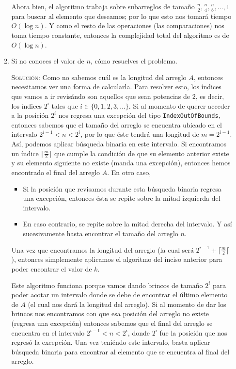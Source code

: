\documentclass[letterpaper,11pt]{article}
\begin{document}
\begin{enumerate}
\begin{enumerate}
        Ahora bien, el algoritmo trabaja sobre subarreglos de tamaño $\frac{n}{2}, 
        \frac{n}{4}, \frac{n}{8}, \ldots, 1$ para buscar al elemento que 
        deseamos; por lo que esto nos tomará tiempo $O(\log n)$. Y como el resto
        de las operaciones (las comparaciones) nos toma tiempo constante, 
        entonces la complejidad total del algoritmo es de $O(\log n)$. 
        
		\item Si no conoces el valor de $n$, cómo resuelves el problema.
        
        \textsc{Solución:} Como no sabemos cuál es la longitud del arreglo $A$, 
        entonces necesitamos ver una forma de calcularla. Para resolver esto, 
        los índices que vamos a ir revisándo son aquellos que sean potencias 
        de $2$, es decir, los índices $2^i$ tales que $i \in 
        \{0, 1, 2, 3, \ldots\}$. Si al momento de querer acceder a la posición 
        $2^i$ nos regresa una excepción del tipo \texttt{IndexOutOfBounds}, 
        entonces sabemos que el tamaño del arreglo se encuentra ubicado en el 
        intervalo $2^{i-1} < n < 2^{i}$, por lo que éste tendrá una longitud 
        de $m =2^{i-1}$. Así, podemos aplicar búsqueda binaria en este intervalo.
        Si encontramos un índice $\lceil \frac{m}{2} \rceil$ que cumple la 
        condición de que su elemento anterior existe y su elemento siguiente no 
        existe (manda una excepción), entonces hemos encontrado el final del 
        arreglo $A$. En otro caso, 
        \begin{itemize}
            \item Si la posición que revisamos durante esta búsqueda binaria 
            regresa una excepción, entonces ésta se repite sobre la mitad 
            izquierda del intervalo.

            \item En caso contrario, se repite sobre la mitad derecha del 
            intervalo. Y así sucesivamente hasta encontrar el tamaño del 
            arreglo $n$.
        \end{itemize}

        Una vez que encontramos la longitud del arreglo (la cual será 
        $2^{i-1} + \lceil \frac{m}{2} \lceil$), entonces simplemente 
        aplicamos el algoritmo del inciso anterior para poder encontrar 
        el valor de $k$.

        Este algoritmo funciona porque vamos dando brincos de tamaño $2^i$ 
        para poder acotar un intervalo donde se debe de encontrar el último 
        elemento de $A$ (el cual nos dará la longitud del arreglo). Si al 
        momento de dar los brincos nos encontramos con que esa posición del 
        arreglo no existe (regresa una excepción) entonces sabemos que el 
        final del arreglo se encuentra en el intervalo $2^{i-1} < n < 2^i$, 
        donde $2^i$ fue la posición que nos regresó la excepción. Una vez 
        teniéndo este intervalo, basta aplicar búsqueda binaria para encontrar 
        al elemento que se encuentra al final del arreglo. 


\end{enumerate}
\end{enumerate}
\end{document}
